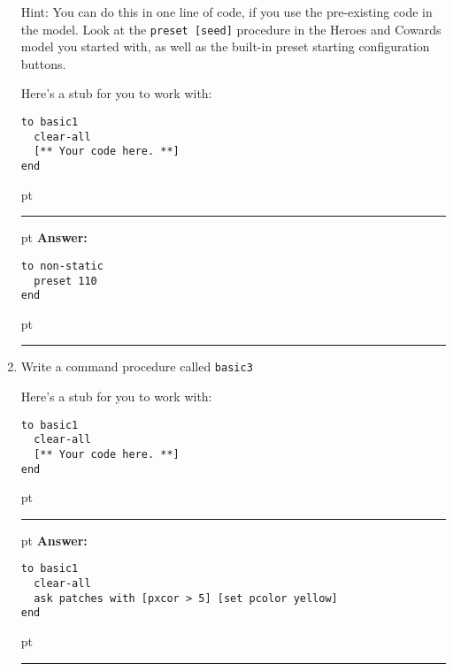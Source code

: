 \documentclass[11pt,oneside]{book}
\begin{document}
\begin{enumerate}
Hint: You can do this in one line of code, if you use the pre-existing code in the model. Look at the \texttt{preset [seed]} procedure in the Heroes and Cowards model you started with, as well as the built-in preset starting configuration buttons.

Here's a stub for you to work with:
\begin{verbatim}
to basic1
  clear-all
  [** Your code here. **]
end
\end{verbatim}

\ifnum{}
 pt
\hrule
{} pt
{\bf Answer: }
\begin{verbatim}
to non-static 
  preset 110
end
\end{verbatim}
 pt
\hrule
\fi

\item Write a command procedure called \texttt{basic3} 

Here's a stub for you to work with:
\begin{verbatim}
to basic1
  clear-all
  [** Your code here. **]
end
\end{verbatim}

\ifnum{}
 pt
\hrule
{} pt
{\bf Answer: }
\begin{verbatim}
to basic1
  clear-all
  ask patches with [pxcor > 5] [set pcolor yellow]
end
\end{verbatim}
 pt
\hrule
\fi

\end{enumerate}
\end{document}
